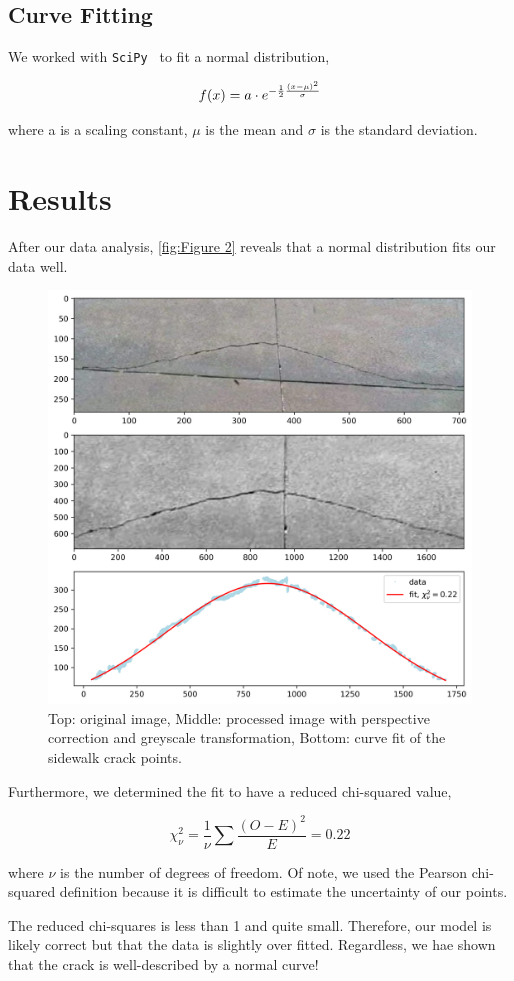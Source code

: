 \documentclass{article}
\begin{document}
\subsection{Curve Fitting}
We worked with \texttt{SciPy \cite{2020SciPy-NMeth}} to fit a normal distribution,

\begin{equation}
    \large f(x) = a \cdot e^{{-\frac{1}{2}}{\frac{(x-\mu)^2}{\sigma}}} 
    \end{equation}

where a is a scaling constant, $\mu$ is the mean and $\sigma$ is the standard deviation.

\section{Results}
After our data analysis, \autoref{fig:Figure 2} reveals that a normal distribution fits our data well.

\begin{figure} [H]
    \centering
    \includegraphics[width=0.5\linewidth]{fit.png}
    \caption{Top: original image, Middle: processed image with perspective correction and greyscale transformation, Bottom: curve fit of the sidewalk crack points.}
    \label{fig:Figure 2}
\end{figure}

Furthermore, we determined the fit to have a reduced chi-squared value,

\begin{equation}
    \chi_\nu^2 = \frac{1}{\nu}\sum{\frac{(O-E)^2}{E}}= 0.22
\end{equation}

where $\nu$ is the number of degrees of freedom. Of note, we used the Pearson chi-squared definition because it is difficult to estimate the uncertainty of our points.

\pagebreak

The reduced chi-squares is less than 1 and quite small. Therefore, our model is likely correct but that the data is slightly over fitted. Regardless, we hae shown that the crack is well-described by a normal curve!



\nocite{*}
\end{document}
